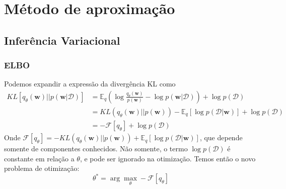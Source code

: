 \documentclass{beamer}
\begin{document}
\section{Método de aproximação}

\subsection{Inferência Variacional}


\begin{frame}
    \frametitle{ELBO}

    Podemos expandir a expressão da divergência KL como
    \begin{align*}
        KL[q_\theta(\mathbf{w}) || p(\mathbf{w}|\mathcal{D})] &= \mathbb{E}_q \left(\log \frac{q_\theta(\mathbf{w})}{p(\mathbf{w})} - \log p(\mathbf{w}|\mathcal{D}) \right) + \log p(\mathcal{D})
        \\&= KL\left( q_\theta(\mathbf{w})||p(\mathbf{w}) \right) - \mathbb{E}_q \left[\log p(\mathcal{D}|\mathbf{w})\right] + \log p(\mathcal{D})
        \\&= - \mathcal{F}[q_\theta] + \log p(\mathcal{D})
    \end{align*}
    Onde $\mathcal{F}[q_\theta] = - KL\left( q_\theta(\mathbf{w})||p(\mathbf{w}) \right) + \mathbb{E}_q \left[\log p(\mathcal{D}|\mathbf{w})\right]$, que depende somente de componentes conhecidos. Não somente, o termo $\log p(\mathcal{D})$ é constante em relação a $\theta$, e pode ser ignorado na otimização. Temos então o novo problema de otimização:
    $$ \theta^* = \arg\max_\theta -\mathcal{F}[q_\theta] $$
\end{frame}
\end{document}
